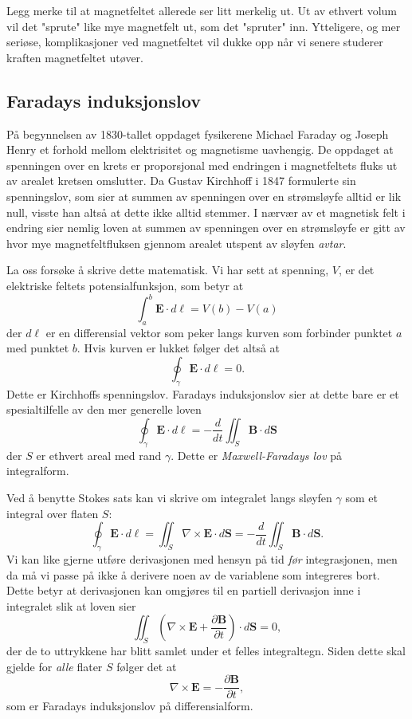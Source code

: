 \documentclass[twoside,utf8]{article}
\begin{document}
  Legg merke til at magnetfeltet allerede ser litt merkelig ut. Ut av ethvert volum vil det "sprute" like mye magnetfelt ut, som det "spruter" inn. Ytteligere, og mer seriøse, komplikasjoner ved magnetfeltet vil dukke opp når vi senere studerer kraften magnetfeltet utøver.




\subsection{Faradays induksjonslov}
På begynnelsen av 1830-tallet oppdaget fysikerene Michael Faraday og Joseph Henry et forhold mellom elektrisitet og magnetisme uavhengig. De oppdaget at spenningen over en krets er proporsjonal med endringen i magnetfeltets fluks ut av arealet kretsen omslutter.
Da Gustav Kirchhoff i 1847 formulerte sin spenningslov, som sier at summen av spenningen over en strømsløyfe alltid er lik null, visste han altså at dette ikke alltid stemmer. I nærvær av et magnetisk felt i endring sier nemlig loven at summen av spenningen over en strømsløyfe er gitt av hvor mye magnetfeltfluksen gjennom arealet utspent av sløyfen {\it avtar}.


  La oss forsøke å skrive dette matematisk. Vi har sett at spenning, $V$, er det elektriske feltets potensialfunksjon, som betyr at
  $$
  \int_a^b \mathbf{E} \cdot d\mathbf{\ell} = V(b)-V(a)
  $$
  der $d\mathbf{\ell}$ er en differensial vektor som peker langs kurven som forbinder punktet $a$ med punktet $b$. Hvis kurven er lukket følger det altså at
  $$
  \oint_\gamma \mathbf{E} \cdot d\mathbf{\ell} = 0.
  $$
  Dette er Kirchhoffs spenningslov. Faradays induksjonslov sier at dette bare er et spesialtilfelle av den mer generelle loven
  $$
  \oint_\gamma \mathbf{E} \cdot d\mathbf{\ell} = -\frac{d}{dt}\iint_S \mathbf{B} \cdot d\mathbf{S}
  $$
  der $S$ er ethvert areal med rand $\gamma$. Dette er {\it Maxwell-Faradays lov} på integralform.



  Ved å benytte Stokes sats kan vi skrive om integralet langs sløyfen $\gamma$ som et integral over flaten $S$:
  $$
  \oint_\gamma \mathbf{E} \cdot d\ell = \iint_S \nabla \times \mathbf{E} \cdot d\mathbf{S} = -\frac{d}{dt}\iint_S \mathbf{B} \cdot d\mathbf{S}.
  $$
  Vi kan like gjerne utføre derivasjonen med hensyn på tid {\it før} integrasjonen, men da må vi passe på ikke å derivere noen av de variablene som integreres bort. Dette betyr at derivasjonen kan omgjøres til en partiell derivasjon inne i integralet slik at loven sier
  $$
  \iint_S \left( \nabla \times \mathbf{E} + \frac{\partial \mathbf{B}}{\partial t} \right)\cdot d\mathbf{S} = 0,
  $$
  der de to uttrykkene har blitt samlet under et felles integraltegn. Siden dette skal gjelde for {\it alle} flater $S$ følger det at
  $$
  \nabla \times \mathbf{E} =- \frac{\partial \mathbf{B}}{\partial t},
  $$
  som er Faradays induksjonslov på differensialform.
\end{document}
